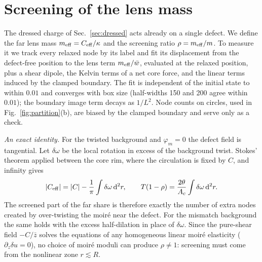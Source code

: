 \documentclass[prb,twocolumn,superscriptaddress,floatfix,10pt]{revtex4-2}
\newcommand{\dd}{\mathrm{d}}
\begin{document}
\section{Screening of the lens mass}\label{sec:screen}

The dressed charge of Sec.~\ref{sec:dressed} acts already on a single defect. We define the far lens mass $m_{\rm eff}=C_{\rm eff}/\kappa$ and the screening ratio $\rho=m_{\rm eff}/m$. To measure it we track every relaxed node by its label and fit its displacement from the defect-free position to the lens term $m_{\rm eff}/\bar w$, evaluated at the relaxed position, plus a shear dipole, the Kelvin terms of a net core force, and the linear terms induced by the clamped boundary. The fit is independent of the initial state to within $0.01$ and converges with box size (half-widths 150 and 200 agree within $0.01$); the boundary image term decays as $1/L^2$. Node counts on circles, used in Fig.~\ref{fig:partition}(b), are biased by the clamped boundary and serve only as a check.

\emph{An exact identity.} For the twisted background and $\varphi_m=0$ the defect field is tangential. Let $\delta\omega$ be the local rotation in excess of the background twist. Stokes' theorem applied between the core rim, where the circulation is fixed by $C$, and infinity gives
\begin{equation}
|C_{\rm eff}|=|C|-\frac1\pi\int\delta\omega\,\dd^2r,\qquad T(1-\rho)=\frac{2\theta}{A_c}\int\delta\omega\,\dd^2r .
\label{eq:stokes}
\end{equation}
The screened part of the far share is therefore exactly the number of extra nodes created by over-twisting the moir\'e near the defect. For the mismatch background the same holds with the excess half-dilation in place of $\delta\omega$. Since the pure-shear field $-C/\bar z$ solves the equations of any homogeneous linear moir\'e elasticity ($\partial_z\delta u=0$), no choice of moir\'e moduli can produce $\rho\neq1$: screening must come from the nonlinear zone $r\lesssim R$.
\end{document}

